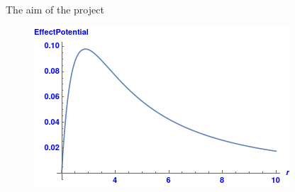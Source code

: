 \documentclass{article}
\begin{document}
{The aim of the project}
\begin{figure}[htbp]
\centerline{\includegraphics[scale=.5]{effpot.png}}
\label{fig}
\end{figure}
\end{document}
